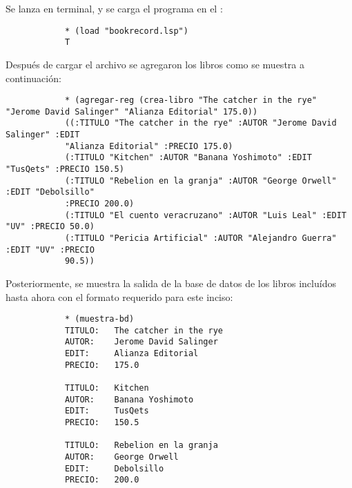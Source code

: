 \begin{enumerate}
\begin{solution}
        Se lanza  en terminal, y se carga el programa en el :
        \begin{verbatim}
            * (load "bookrecord.lsp")
            T
        \end{verbatim}

        Después de cargar el archivo se agregaron los libros como se muestra a continuación:
        \begin{verbatim}
            * (agregar-reg (crea-libro "The catcher in the rye" "Jerome David Salinger" "Alianza Editorial" 175.0))
            ((:TITULO "The catcher in the rye" :AUTOR "Jerome David Salinger" :EDIT
            "Alianza Editorial" :PRECIO 175.0)
            (:TITULO "Kitchen" :AUTOR "Banana Yoshimoto" :EDIT "TusQets" :PRECIO 150.5)
            (:TITULO "Rebelion en la granja" :AUTOR "George Orwell" :EDIT "Debolsillo"
            :PRECIO 200.0)
            (:TITULO "El cuento veracruzano" :AUTOR "Luis Leal" :EDIT "UV" :PRECIO 50.0)
            (:TITULO "Pericia Artificial" :AUTOR "Alejandro Guerra" :EDIT "UV" :PRECIO
            90.5))
        \end{verbatim}

        Posteriormente, se muestra la salida de la base de datos de los libros incluídos hasta ahora con el formato requerido para este inciso:
        \begin{verbatim}
            * (muestra-bd)
            TITULO:   The catcher in the rye
            AUTOR:    Jerome David Salinger
            EDIT:     Alianza Editorial
            PRECIO:   175.0

            TITULO:   Kitchen
            AUTOR:    Banana Yoshimoto
            EDIT:     TusQets
            PRECIO:   150.5

            TITULO:   Rebelion en la granja
            AUTOR:    George Orwell
            EDIT:     Debolsillo
            PRECIO:   200.0


\end{verbatim}
\end{solution}
\end{enumerate}
